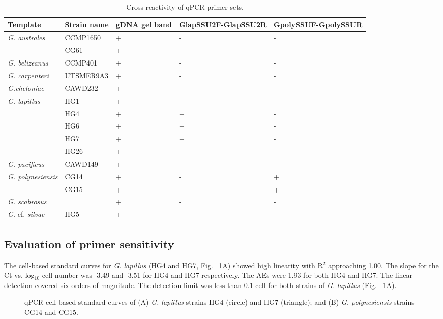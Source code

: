 \documentclass[12pt]{article}
\begin{document}
\FloatBarrier
\begin{table}
\caption{Cross-reactivity of qPCR primer sets.}
\label{tbl:CrossreactTable}
\begin{tabular}{ | p{4cm} | p{3cm} | p{2cm} | p{2.5cm} | p{2.5cm} | }
\hline
\textbf{Template} & \textbf{Strain name} & \textbf{gDNA gel band} & \textbf{GlapSSU2F-GlapSSU2R} & \textbf{GpolySSUF-GpolySSUR} \\
\hline
\emph{G. australes} & CCMP1650 &+&-&- \\
\hline
& CG61 &+&-&- \\
\hline
\emph{G. belizeanus}&CCMP401&+&-&-\\
\hline
\emph{G. carpenteri}&UTSMER9A3&+&-&-\\
\hline
\emph{G.cheloniae}&CAWD232&+&-&-\\
\hline
\emph{G. lapillus}&HG1&+&+&-\\
\hline
&HG4&+&+&-\\
\hline
&HG6&+&+&-\\
\hline
&HG7&+&+&-\\
\hline
&HG26&+&+&-\\
\hline
\emph{G. pacificus}&CAWD149&+&-&-\\
\hline
\emph{G. polynesiensis}&CG14&+&-&+\\
\hline
&CG15&+&-&+\\
\hline
\emph{G. scabrosus}&&+&-&-\\
\hline
\emph{G.} cf. \emph{silvae}&HG5&+&-&-\\
\hline
\end{tabular}
\end{table}
\FloatBarrier
 
\subsection*{Evaluation of primer sensitivity}
The cell-based standard curves for \emph{G. lapillus} (HG4 and HG7, Fig. ~\ref{fig:lapiStd}A) showed high linearity with R$^{2}$ approaching 1.00. The slope for the Ct vs. log$_{10}$ cell number was -3.49 and -3.51 for HG4 and HG7 respectively. The AEs were 1.93 for both HG4 and HG7. The linear detection covered six orders of magnitude. The detection limit was less than 0.1 cell for both strains of \emph{G. lapillus} (Fig. ~\ref{fig:lapiStd}A).
\begin{figure}
\caption{qPCR cell based standard curves of (A) \emph{G. lapillus} strains HG4 (circle) and HG7 (triangle); and (B) \emph{G. polynesiensis} strains CG14 and CG15.} %
\label{fig:lapiStd}
\end{figure}
\FloatBarrier
\end{document}
